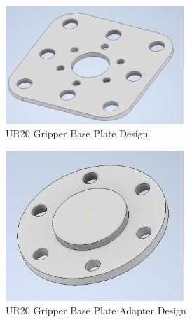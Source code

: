 \begin{figure}[h!]
	\centering
 	\includegraphics[width=0.60\textwidth]{images/g_base.png}
 \caption{UR20 Gripper Base Plate Design}
\end{figure}

\begin{figure}[h!]
	\centering
 	\includegraphics[width=0.60\textwidth]{images/G_adapter.png}
 \caption{UR20 Gripper Base Plate Adapter Design}
\end{figure}